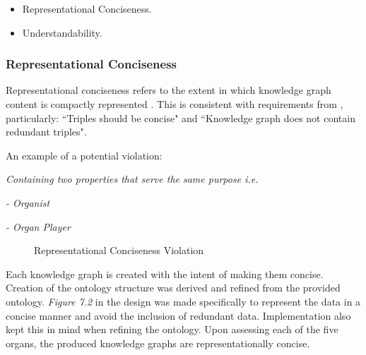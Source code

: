 \vspace{-0.15cm}
\begin{itemize}
    \itemsep0em 
\item Representational Conciseness.
\vspace{-0.1cm}
\item Understandability.
\end{itemize}
\vspace{-0.4cm}

\subsubsection{Representational Conciseness}
\hspace{0.5cm} Representational conciseness refers to the extent in which knowledge graph content is compactly represented \cite{knowledgegraphevaulationbook}. This is consistent with requirements from \cite{evaluationpaper}, particularly: ``Triples should be concise" and ``Knowledge graph does not contain redundant triples".

\noindent An example of a potential violation: 
\vspace{-0.1cm}
\begin{displayquote}
    \textit{Containing two properties that serve the same purpose i.e.}
\end{displayquote}
\vspace{-0.65cm}
\begin{displayquote}
    \textit{- Organist}
\end{displayquote}
\vspace{-0.825cm}
\begin{displayquote}
    \textit{- Organ Player}
\end{displayquote}

\begin{figure}[H]
\begin{center}
\end{center}
\vspace{-0.5cm}
\caption{Representational Conciseness Violation}
\end{figure}

Each knowledge graph is created with the intent of making them concise. Creation of the ontology structure was derived and refined from the provided ontology. \textit{Figure 7.2} in the design was made specifically to represent the data in a concise manner and avoid the inclusion of redundant data. Implementation also kept this in mind when refining the ontology. Upon assessing each of the five organs, the produced knowledge graphs are representationally concise.


